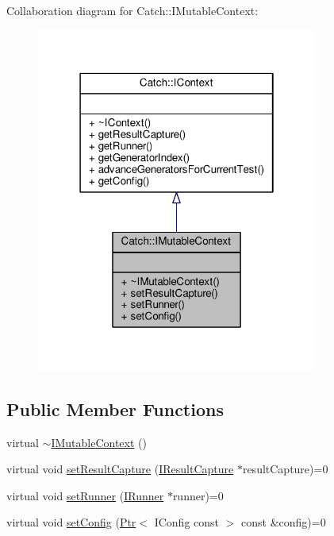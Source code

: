 Collaboration diagram for Catch\-:\-:I\-Mutable\-Context\-:
\nopagebreak
\begin{figure}[H]
\begin{center}
\leavevmode
\includegraphics[width=262pt]{struct_catch_1_1_i_mutable_context__coll__graph}
\end{center}
\end{figure}
\subsection*{Public Member Functions}
\begin{DoxyCompactItemize}
\item 
virtual \hyperlink{struct_catch_1_1_i_mutable_context_a93f32b2ab6d0fb83637059240be799ab}{$\sim$\-I\-Mutable\-Context} ()
\item 
virtual void \hyperlink{struct_catch_1_1_i_mutable_context_a4a80afd0525b7def21bee8d9b48f2d39}{set\-Result\-Capture} (\hyperlink{struct_catch_1_1_i_result_capture}{I\-Result\-Capture} $\ast$result\-Capture)=0
\item 
virtual void \hyperlink{struct_catch_1_1_i_mutable_context_af2e53b1dea4527a2587cff266a730f6e}{set\-Runner} (\hyperlink{struct_catch_1_1_i_runner}{I\-Runner} $\ast$runner)=0
\item 
virtual void \hyperlink{struct_catch_1_1_i_mutable_context_a04ae4f4219a481a7bf658d9fd445bc1d}{set\-Config} (\hyperlink{class_catch_1_1_ptr}{Ptr}$<$ I\-Config const  $>$ const \&config)=0
\end{DoxyCompactItemize}


